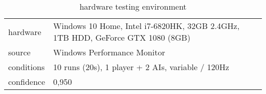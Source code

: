 \begin{table}[!ht]
	\centering
    \begin{tabular}{l|l}
        hardware & Windows 10 Home, Intel i7-6820HK, 32GB 2.4GHz, 1TB HDD, GeForce GTX 1080 (8GB) \\
		source & Windows Performance Monitor \\
		conditions & 10 runs (20s), 1 player + 2 AIs, variable / 120Hz \\
		confidence & 0,950 \\
    \end{tabular}

    \caption{hardware testing environment}\label{tb:performance:hardware}
\end{table}
